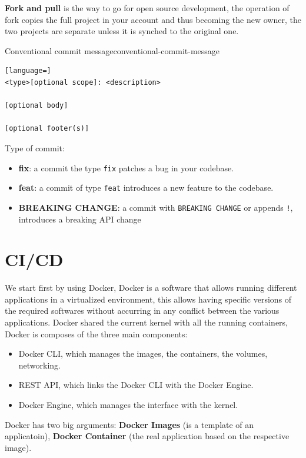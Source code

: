 \documentclass[12pt]{article}
\begin{document}
\textbf{Fork and pull} is the way to go for open source development, the operation of fork copies the full project in your account and thus becoming the new owner, the two projects are separate unless it is synched to the original one.
\begin{definition}{Conventional commit message}{conventional-commit-message}
\begin{lstlisting}[language=]
<type>[optional scope]: <description>

[optional body]

[optional footer(s)]
\end{lstlisting}
  Type of commit: 
  \begin{itemize}
    \item \textbf{fix}: a commit the type \texttt{fix} patches a bug in your codebase.
    \item \textbf{feat}: a commit of type \texttt{feat} introduces a new feature to the codebase.
    \item \textbf{BREAKING CHANGE}: a commit with \texttt{BREAKING CHANGE} or appends \texttt{!}, introduces a breaking API change
  \end{itemize}
\end{definition}


\newpage
\section{CI/CD}
We start first by using Docker, Docker is a software that allows running different applications in a virtualized environment, this allows having specific versions of the required softwares without accurring in any conflict between the various applications. Docker shared the current kernel with all the running containers, Docker is composes of the three main components:
\begin{itemize}
  \item Docker CLI, which manages the images, the containers, the volumes, networking.
  \item REST API, which links the Docker CLI with the Docker Engine.
  \item Docker Engine, which manages the interface with the kernel.
\end{itemize}
Docker has two big arguments: \textbf{Docker Images} (is a template of an applicatoin), \textbf{Docker Container} (the real application based on the respective image).
\end{document}
